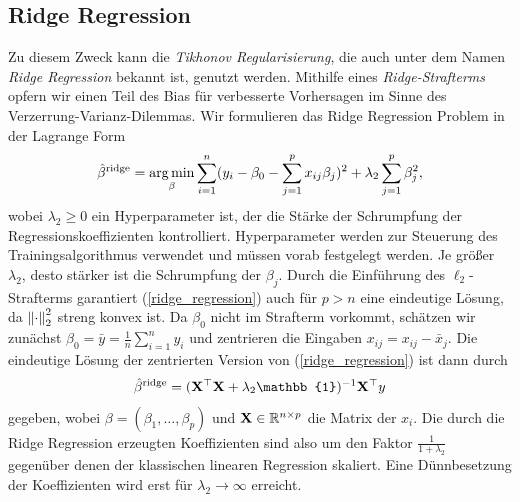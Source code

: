 

\subsection{Ridge Regression}

Zu diesem Zweck kann die \textit{Tikhonov Regularisierung}, die auch unter dem Namen \textit{Ridge Regression} bekannt ist, genutzt werden. Mithilfe eines \textit{Ridge-Strafterms} opfern wir einen Teil des Bias für verbesserte Vorhersagen im Sinne des Verzerrung-Varianz-Dilemmas. Wir formulieren das Ridge Regression Problem in der Lagrange Form
\begin{align}
\label{ridge_regression}
\hat{\beta}^{\text{ridge}} = \operatorname*{arg\,min}_{\beta} \sum_{i=1}^{n}(y_i - \beta_0 - \sum_{j=1}^p x_{ij}\beta_j)^2 + \lambda_2\sum_{j=1}^p \beta_j^2,
\end{align}
wobei $\lambda_2 \geq 0$ ein Hyperparameter ist, der die Stärke der Schrumpfung der Regressionskoeffizienten kontrolliert. Hyperparameter werden zur Steuerung des Trainingsalgorithmus verwendet und müssen vorab festgelegt werden. Je größer $\lambda_2$, desto stärker ist die Schrumpfung der $\beta_j$. Durch die Einführung des $\ell_2$-Strafterms garantiert (\ref{ridge_regression}) auch für $p > n$ eine eindeutige Lösung, da $\left\lVert \cdot \right\rVert_{2}^{2}$ streng konvex ist. Da $\beta_0$ nicht im Strafterm vorkommt, schätzen wir zunächst $\beta_0 = \bar{y} = \frac{1}{n}\sum_{i=1}^{n} y_i$ und zentrieren die Eingaben $x_{ij} = x_{ij} - \bar{x}_j$. Die eindeutige Lösung der zentrierten Version von (\ref{ridge_regression}) ist dann durch
\begin{align}
\hat{\beta}^{\text{ridge}}  = (\mat X^{\top} \mat X + \lambda_2\mat{\mathbb{1}})^{-1}\mat{X}^{\top}y
\end{align}
gegeben, wobei $\beta = (\beta_1, \ldots, \beta_p)$ und $\mathbf{X} \in \mathbb{R}^{n \times p}$ die Matrix der $x_i$. Die durch die Ridge Regression erzeugten Koeffizienten sind also um den Faktor $\frac{1}{1+\lambda_2}$ gegenüber denen der klassischen linearen Regression skaliert. Eine Dünnbesetzung der Koeffizienten wird erst für $\lambda_2 \to \infty$ erreicht.




